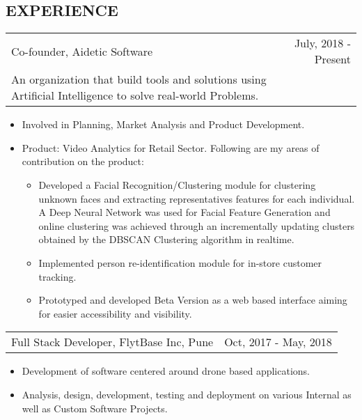 \documentclass[margin]{res}
\begin{document}
\begin{resume}
\section{EXPERIENCE}
								\begin{tabular}{p{3.7in} r} %
								Co-founder, Aidetic Software & July, 2018 - Present \\
								An organization that build tools and solutions using Artificial Intelligence to solve real-world Problems.
								\end{tabular}
								\begin{itemize} %
									\item[] Involved in Planning, Market Analysis and Product Development.
									\item[] Product: Video Analytics for Retail Sector. Following are my areas of contribution on the product:
									\begin{itemize}
										\item Developed a Facial Recognition/Clustering module for clustering unknown faces and extracting representatives features for each individual. A Deep Neural Network was used for Facial Feature Generation and online clustering was achieved through an incrementally updating clusters obtained by the DBSCAN Clustering algorithm in realtime.
										\item Implemented person re-identification module for in-store customer tracking.
										\item Prototyped and developed Beta Version as a web based interface aiming for easier accessibility and visibility.
									\end{itemize}
				       	\end{itemize}
								\begin{tabular}{p{3.5in} r} %
								Full Stack Developer, FlytBase Inc, Pune & Oct, 2017 - May, 2018
								\end{tabular}
								\begin{itemize} %
	                \item[] Development of software centered around drone based applications.
	              	\item[] Analysis, design, development, testing and deployment on various Internal as well as Custom Software Projects.
	                \begin{itemize}

\end{itemize}
\end{itemize}
\end{resume}
\end{document}
